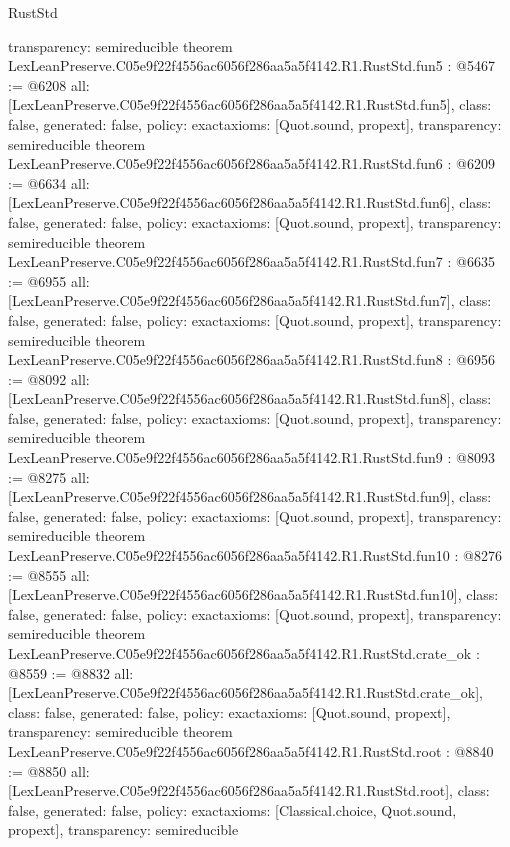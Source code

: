 \begin{lexlean}{RustStd}
\begin{coremodule}
{  transparency: semireducible
}
theorem LexLeanPreserve.C05e9f22f4556ac6056f286aa5a5f4142.R1.RustStd.fun5 : @5467 := @6208 {
  all: [LexLeanPreserve.C05e9f22f4556ac6056f286aa5a5f4142.R1.RustStd.fun5],
  class: false,
  generated: false,
  policy: exact{axioms: [Quot.sound, propext]},
  transparency: semireducible
}
theorem LexLeanPreserve.C05e9f22f4556ac6056f286aa5a5f4142.R1.RustStd.fun6 : @6209 := @6634 {
  all: [LexLeanPreserve.C05e9f22f4556ac6056f286aa5a5f4142.R1.RustStd.fun6],
  class: false,
  generated: false,
  policy: exact{axioms: [Quot.sound, propext]},
  transparency: semireducible
}
theorem LexLeanPreserve.C05e9f22f4556ac6056f286aa5a5f4142.R1.RustStd.fun7 : @6635 := @6955 {
  all: [LexLeanPreserve.C05e9f22f4556ac6056f286aa5a5f4142.R1.RustStd.fun7],
  class: false,
  generated: false,
  policy: exact{axioms: [Quot.sound, propext]},
  transparency: semireducible
}
theorem LexLeanPreserve.C05e9f22f4556ac6056f286aa5a5f4142.R1.RustStd.fun8 : @6956 := @8092 {
  all: [LexLeanPreserve.C05e9f22f4556ac6056f286aa5a5f4142.R1.RustStd.fun8],
  class: false,
  generated: false,
  policy: exact{axioms: [Quot.sound, propext]},
  transparency: semireducible
}
theorem LexLeanPreserve.C05e9f22f4556ac6056f286aa5a5f4142.R1.RustStd.fun9 : @8093 := @8275 {
  all: [LexLeanPreserve.C05e9f22f4556ac6056f286aa5a5f4142.R1.RustStd.fun9],
  class: false,
  generated: false,
  policy: exact{axioms: [Quot.sound, propext]},
  transparency: semireducible
}
theorem LexLeanPreserve.C05e9f22f4556ac6056f286aa5a5f4142.R1.RustStd.fun10 : @8276 := @8555 {
  all: [LexLeanPreserve.C05e9f22f4556ac6056f286aa5a5f4142.R1.RustStd.fun10],
  class: false,
  generated: false,
  policy: exact{axioms: [Quot.sound, propext]},
  transparency: semireducible
}
theorem LexLeanPreserve.C05e9f22f4556ac6056f286aa5a5f4142.R1.RustStd.crate_ok : @8559 := @8832 {
  all: [LexLeanPreserve.C05e9f22f4556ac6056f286aa5a5f4142.R1.RustStd.crate_ok],
  class: false,
  generated: false,
  policy: exact{axioms: [Quot.sound, propext]},
  transparency: semireducible
}
theorem LexLeanPreserve.C05e9f22f4556ac6056f286aa5a5f4142.R1.RustStd.root : @8840 := @8850 {
  all: [LexLeanPreserve.C05e9f22f4556ac6056f286aa5a5f4142.R1.RustStd.root],
  class: false,
  generated: false,
  policy: exact{axioms: [Classical.choice, Quot.sound, propext]},
  transparency: semireducible
}


\end{coremodule}
\end{lexlean}

